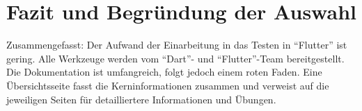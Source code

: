 \section{Fazit und Begründung der Auswahl}
\label{sec:Fazit-und-Begründung-der-Auswahl}


Zusammengefasst: Der Aufwand der Einarbeitung in das Testen in \enquote{Flutter} ist gering.
Alle Werkzeuge werden vom \enquote{Dart}- und \enquote{Flutter}-Team bereitgestellt.
Die Dokumentation ist umfangreich, folgt jedoch einem roten Faden.
Eine Übersichtsseite fasst die Kerninformationen zusammen und verweist auf die jeweiligen  Seiten für detailliertere Informationen und Übungen.